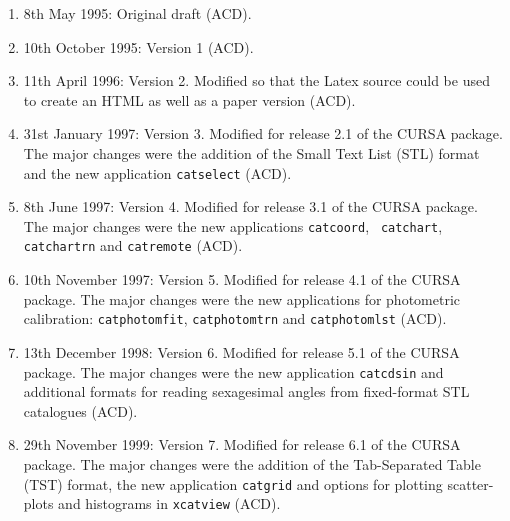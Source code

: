 \documentclass[twoside,11pt]{article}
\newcommand{\htmladdnormallink}[2]{#1}
\renewcommand{\_}{\texttt{\symbol{95}}}
\begin{document}
\begin{enumerate}

  \item 8th May 1995: Original draft (ACD).

  \item 10th October 1995: \htmladdnormallink{Version 1}
   {http://www.roe.ac.uk/acdwww/cursa/news/v1_1.lis} (ACD).

  \item 11th April 1996: Version 2.  Modified so that the Latex source
   could be used to create an HTML as well as a paper version (ACD).

  \item 31st January 1997: Version 3.
   Modified for \htmladdnormallink{release 2.1}
   {http://www.roe.ac.uk/acdwww/cursa/news/v2_1.lis} of the CURSA package.
   The major changes were the addition of the Small Text List (STL) format
   and the new application {\tt catselect} (ACD).

  \item 8th June 1997: Version 4.
   Modified for \htmladdnormallink{release 3.1}
   {http://www.roe.ac.uk/acdwww/cursa/news/v3_1.lis} of the CURSA package.
   The major changes were the new applications {\tt catcoord}, {\tt
   catchart}, {\tt catchartrn} and {\tt catremote} (ACD).

  \item 10th November 1997: Version 5.
   Modified for \htmladdnormallink{release 4.1}
   {http://www.roe.ac.uk/acdwww/cursa/news/v4_1.lis} of the CURSA package.
   The major changes were the new applications for photometric calibration:
   {\tt catphotomfit}, {\tt catphotomtrn} and {\tt catphotomlst} (ACD).

  \item 13th December 1998: Version 6.
   Modified for \htmladdnormallink{release 5.1}
   {http://www.roe.ac.uk/acdwww/cursa/news/v5_1.lis} of the CURSA package.
   The major changes were the new application {\tt catcdsin} and additional
   formats for reading sexagesimal angles from fixed-format STL catalogues
   (ACD).

  \item 29th November 1999: Version 7.
   Modified for \htmladdnormallink{release 6.1}
   {http://www.roe.ac.uk/acdwww/cursa/news/v6_1.lis} of the CURSA package.
   The major changes were the addition of the Tab-Separated Table (TST)
   format, the new application {\tt catgrid} and options for plotting
   scatter-plots and histograms in {\tt xcatview} (ACD).


\end{enumerate}
\end{document}
